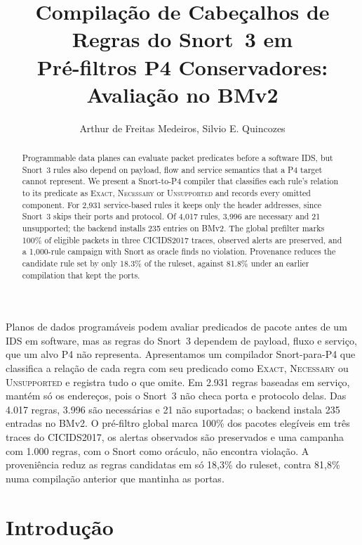 \documentclass[12pt]{article}
\title{Compilação de Cabeçalhos de Regras do Snort~3 em\\
Pré-filtros P4 Conservadores: Avaliação no BMv2}
\author{Arthur de Freitas Medeiros\inst{1}, Silvio E. Quincozes\inst{2}}
\newcommand{\cls}[1]{\textup{\textsc{#1}}}
\begin{document}
\maketitle

\begin{abstract}
Programmable data planes can evaluate packet predicates before a software
IDS, but Snort~3 rules also depend on payload, flow and service semantics
that a P4 target cannot represent. We present a Snort-to-P4 compiler that
classifies each rule's relation to its predicate as \cls{Exact},
\cls{Necessary} or \cls{Unsupported} and records every omitted component.
For 2,931 service-based rules it keeps only the header addresses, since
Snort~3 skips their ports and protocol. Of 4,017 rules, 3,996 are necessary
and 21 unsupported; the backend installs 235 entries on BMv2. The global
prefilter marks 100\% of eligible packets in three CICIDS2017 traces,
observed alerts are preserved, and a 1,000-rule campaign with Snort as oracle
finds no violation. Provenance reduces the candidate rule set by only 18.3\%
of the ruleset, against 81.8\% under an earlier compilation that kept the
ports.
\end{abstract}

\begin{resumo}
Planos de dados programáveis podem avaliar predicados de pacote antes de um
IDS em software, mas as regras do Snort~3 dependem de payload, fluxo e
serviço, que um alvo P4 não representa. Apresentamos um compilador
Snort-para-P4 que classifica a relação de cada regra com seu predicado como
\cls{Exact}, \cls{Necessary} ou \cls{Unsupported} e registra tudo o que
omite. Em 2.931 regras baseadas em serviço, mantém só os endereços, pois o
Snort~3 não checa porta e protocolo delas. Das 4.017
regras, 3.996 são necessárias e 21 não suportadas; o backend instala 235
entradas no BMv2. O pré-filtro global marca 100\% dos pacotes elegíveis em
três traces do CICIDS2017, os alertas observados são preservados e uma
campanha com 1.000 regras, com o Snort como oráculo, não encontra violação.
A proveniência reduz as regras candidatas em só 18,3\% do ruleset, contra
81,8\% numa compilação anterior que mantinha as portas.
\end{resumo}

\section{Introdução}
\end{document}
